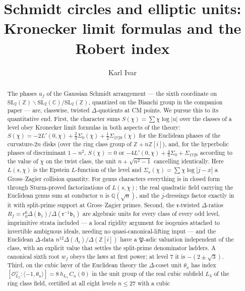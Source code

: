 \documentclass[11pt]{amsart}
\numberwithin{equation}{section}
\theoremstyle{plain}
\theoremstyle{definition}
\theoremstyle{remark}
\newcommand{\C}{\mathbb{C}}
\newcommand{\Q}{\mathbb{Q}}
\newcommand{\Z}{\mathbb{Z}}
\newcommand{\SL}{\mathrm{SL}}
\newcommand{\idealb}{\mathfrak{b}}
\newcommand{\idealc}{\mathfrak{c}}
\newcommand{\idealP}{\mathfrak{P}}
\newcommand{\idealr}{\mathfrak{r}}
\newcommand{\Oc}{\mathcal{O}}
\begin{document}
\title[Schmidt circles and elliptic units]{Schmidt circles and elliptic
units:\\ Kronecker limit formulas and the Robert index}

\author{Karl Ivar}

\begin{abstract}
The phases $u_f$ of the Gaussian Schmidt arrangement --- the sixth
coordinate on $\SL_2(\Z)\backslash\SL_2(\C)/\SL_2(\Z)$, quantized on the
Bianchi group in the companion paper --- are, classwise, twisted
$\Delta$-quotients at CM points.  We pursue this to its quantitative end.
First, the character sums $S(\chi) = \sum\chi\log|u|$ over the classes of
a level obey Kronecker limit formulas in both aspects of the theory:
$S(\chi) = -2L'(0,\chi) + \tfrac23\Sigma_0(\chi) + \tfrac12\Sigma_{1728}(\chi)$
for the Euclidean phases of the curvature-$2n$ disks (over the ring class
group of $\Z + n\Z[i]$), and, for the hyperbolic phases of discriminant
$1-n^2$, $S(\chi) = 0$ or $-4L'(0,\chi) + \tfrac43\Sigma_0 + \Sigma_{1728}$
according to the value of $\chi$ on the twist class, the unit
$n + \sqrt{n^2-1}$ cancelling identically.  Here $L(s,\chi)$ is the Epstein
$L$-function of the level and $\Sigma_x(\chi) = \sum\chi\log|j - x|$ a
Gross--Zagier collision quantity.  For genus characters everything is in
closed form through Sturm-proved factorizations of $L(s,\chi)$; the real
quadratic field carrying the Euclidean genus sum at conductor $n$ is
$\Q(\sqrt n)$, and the $j$-dressings factor exactly in it with split-prime
support at Gross--Zagier primes.  Second, the $\idealr$-twisted
$\Delta$-ratios $R_f = r_0^{6}\Delta(\idealb_1)/\Delta(\idealr^{-1}\idealb_1)$
are algebraic units for every class of every odd level, imprimitive strata
included --- a local rigidity argument for isogenies attached to invertible
ambiguous ideals, needing no quasi-canonical-lifting input --- and the
Euclidean $\Delta$-data $n^{12}\Delta(\Lambda_\idealc)/\Delta(\Z[i])$ have a
$\idealP$-adic valuation independent of the class, with an explicit value
that settles the split-prime denominator ladders.  A canonical sixth root
$w_f$ obeys the laws at first power; at level $7$ it is $-(2\pm\sqrt3)$.
Third, on the cubic layer of the Euclidean theory the $\Delta$-coset unit
$\theta_u$ has index $[\Oc_{L_3}^\times : \langle -1, \theta_u\rangle] =
8\,h_{L_3}\,C_n(0)$ in the unit group of the real cubic subfield $L_3$ of the
ring class field, certified at all eight levels $n \le 27$ with a cubic

\end{abstract}
\end{document}
